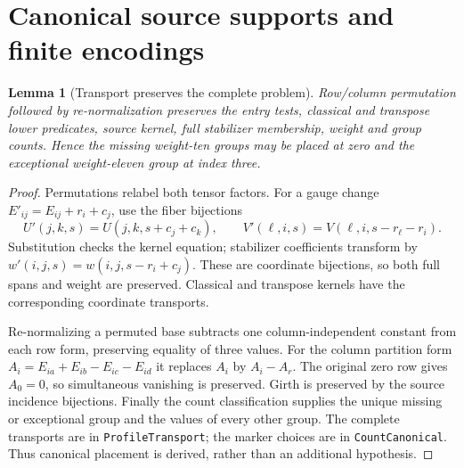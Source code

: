 \documentclass[11pt]{article}
\newtheorem{lemma}[theorem]{Lemma}
\theoremstyle{definition}\newtheorem{definition}[theorem]{Definition}
\begin{document}
\section{Canonical source supports and finite encodings}\label{sec:encoding}
\begin{lemma}[Transport preserves the complete problem]\label{lem:transport}
Row/column permutation followed by re-normalization preserves the entry tests,
classical and transpose lower predicates, source kernel, full stabilizer
membership, weight and group counts. Hence the missing weight-ten groups
may be placed at zero and the exceptional weight-eleven group at index three.
\end{lemma}
\begin{proof}
Permutations relabel both tensor factors. For a gauge change
$E'_{ij}=E_{ij}+r_i+c_j$, use the fiber bijections
\begin{equation}\label{eq:gauge}
 U'(j,k,s)=U(j,k,s+c_j+c_k),\qquad
 V'(\ell,i,s)=V(\ell,i,s-r_\ell-r_i).
\end{equation}
Substitution checks the kernel equation; stabilizer coefficients transform
by $w'(i,j,s)=w(i,j,s-r_i+c_j)$. These are coordinate bijections, so both
full spans and weight are preserved. Classical and transpose kernels have
the corresponding coordinate transports.

Re-normalizing a permuted base subtracts one column-independent constant
from each row form, preserving equality of three values. For the column
partition form $A_i=E_{ia}+E_{ib}-E_{ic}-E_{id}$ it replaces $A_i$ by
$A_i-A_r$. The original zero row gives $A_0=0$, so simultaneous vanishing
is preserved. Girth is preserved by the source incidence bijections.
Finally the count classification supplies the unique missing or exceptional
group and the values of every other group. The complete transports are in
\texttt{ProfileTransport}; the marker choices are in \texttt{CountCanonical}.
Thus canonical placement is derived, rather than an additional hypothesis.
\end{proof}
\end{document}
